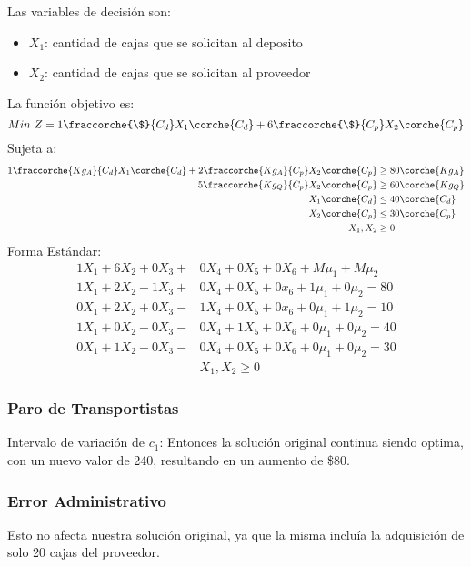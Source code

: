 
\begin{homeworkProblem}
Las variables de decisión son:
\begin{itemize}
	\item $X_1$: cantidad de cajas que se solicitan al deposito
	\item $X_2$: cantidad de cajas  que se solicitan al proveedor 
\end{itemize}
La función objetivo es: 
\begin{equation}
	Min\ Z = 1\fraccorche{\$}{C_d}X_1\corche{C_d} + 6\fraccorche{\$}{C_p}X_2\corche{C_p}
\end{equation}
Sujeta a:
\begin{align*}
	1\fraccorche{Kg_A}{C_d}X_1\corche{C_d} + 2\fraccorche{Kg_A}{C_p}X_2\corche{C_p} &\ge 80 \corche{Kg_A}\\
	5\fraccorche{Kg_Q}{C_p}X_2\corche{C_p} &\ge 60 \corche{Kg_Q} \\
	X_1\corche{C_d} &\le 40\corche{C_d} \\
	X_2\corche{C_p} &\le 30 \corche{C_p} \\
	X_1,X_2 &\ge 0
\end{align*}
Forma Estándar:
\begin{align*}
	1X_1 + 6X_2 + 0X_3 + &0X_4 + 0X_5 + 0X_6 + M\mu_1 + M\mu_2 \\
	1X_1 + 2X_2 - 1X_3 +&0X_4 +0X_5 + 0x_6 + 1\mu_1 + 0\mu_2 = 80 \\
	0X_1 + 2X_2 + 0X_3 -&1X_4 +0X_5 + 0x_6 + 0\mu_1 + 1\mu_2 = 10 \\
	1X_1 + 0X_2 - 0X_3 -&0X_4 + 1X_5 + 0X_6 + 0\mu_1 + 0\mu_2 = 40 \\
	0X_1 + 1X_2 - 0X_3 -&0X_4 + 0X_5 + 0X_6 + 0\mu_1 + 0\mu_2 = 30 \\
	&X_1,X_2 \ge 0
\end{align*}
\subsubsection{Paro de Transportistas}
Intervalo de variación de $c_1$:
Entonces la solución original continua siendo optima, con un nuevo valor de 240, resultando en un aumento de \$80.
\subsubsection{Error Administrativo}
Esto no afecta nuestra solución original, ya que la misma incluía la adquisición de solo 20 cajas del proveedor.

\end{homeworkProblem}
